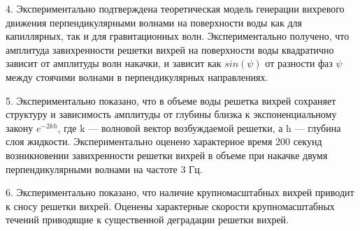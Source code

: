 4. Экспериментально подтверждена теоретическая модель генерации вихревого движения перпендикулярными волнами на поверхности воды как для капиллярных, так и для гравитационных волн. Экспериментально получено, что
амплитуда завихренности решетки вихрей на поверхности воды квадратично зависит от амплитуды волн накачки, и зависит как $sin(\psi)$ от разности фаз $\psi$ между стоячими волнами в перпендикулярных направлениях. 

5. Экспериментально показано, что в объеме воды решетка вихрей сохраняет структуру и зависимость амплитуды от глубины близка к экспоненциальному закону $e^{-2kh}$, где k — волновой вектор возбуждаемой решетки, а h — глубина слоя жидкости. 
Экспериментально оценено характерное время 200 секунд возникновении завихренности решетки вихрей в объеме при накачке двумя перпендикулярными волнами на частоте 3 Гц.

6. Экспериментально показано, что наличие крупномасштабных вихрей приводит к сносу решетки вихрей. Оценены характерные скорости крупномасштабных течений приводящие к существенной деградации решетки вихрей.


